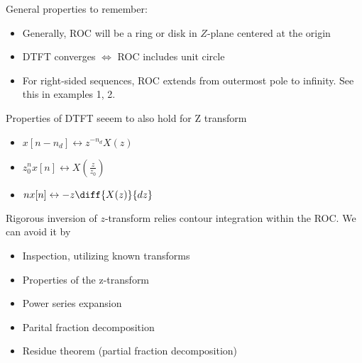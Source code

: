 \documentclass{report}
\begin{document}
General properties to remember:
\begin{itemize}
    \item Generally, ROC will be a ring or disk in $Z$-plane centered at the origin
    \item DTFT converges $\iff$ ROC includes unit circle
    \item For right-sided sequences, ROC extends from outermost pole to infinity. See this in examples 1, 2.
\end{itemize}

Properties of DTFT seeem to also hold for Z transform
\begin{itemize}
    \item $x[n - n_d] \leftrightarrow z^{-n_d} X(z)$
    \item $z_0^n x[n] \leftrightarrow X(\frac{z}{z_0})$
    \item $nx[n] \leftrightarrow -z \diff{X(z)}{dz}$
\end{itemize}

Rigorous inversion of $z$-transform relies contour integration within the ROC. We can avoid it by
\begin{itemize}
    \item Inspection, utilizing known transforms
    \item Properties of the z-transform
    \item Power series expansion
    \item Parital fraction decomposition
    \item Residue theorem (partial fraction decomposition)
\end{itemize}
\end{document}
